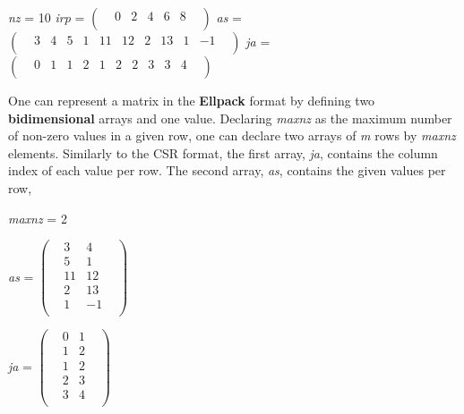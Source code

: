 \documentclass[12pt]{article}
\begin{document}
\begin{center}
\textit{nz}  =  10 
\linebreak
\linebreak
\textit{irp}  =   
$
\begin{pmatrix}
    & 0 & 2 & 4 & 6 & 8 & \\
\end{pmatrix}
$
\linebreak
\linebreak
\textit{as}  =   
$
\begin{pmatrix}
    & 3 & 4 & 5 & 1 & 11 & 12 & 2 & 13 & 1 & -1 & \\
\end{pmatrix}
$
\linebreak
\linebreak
\textit{ja}  =   
$
\begin{pmatrix}
    & 0 & 1 & 1 & 2 & 1 & 2 & 2 & 3 & 3 & 4 & \\
\end{pmatrix}
$
\linebreak
\end{center}

\par One can represent a matrix in the \textbf{Ellpack} format by defining two \textbf{bidimensional} arrays and one value. Declaring \textit{maxnz} as the maximum number of non-zero values in a given row, one can declare two arrays of \textit{m} rows by \textit{maxnz} elements. Similarly to the CSR format, the first array, \textit{ja}, contains the column index of each value per row. The second array, \textit{as}, contains the given values per row,

\begin{center}
\textit{maxnz}  =  2 
\linebreak
\linebreak

\begin{minipage}{.4\textwidth}
  \center
  \textit{as}  =   
$
\begin{pmatrix}
    & 3 & 4 & \\
    & 5 & 1 & \\
    & 11 & 12 & \\
    & 2 & 13 & \\
    & 1 & -1 & \\
\end{pmatrix}
$
\end{minipage}%
\begin{minipage}{.4\textwidth}
 \center
  \textit{ja}  =   
$
\begin{pmatrix}
    & 0 & 1 & \\
    & 1 & 2 & \\
    & 1 & 2 & \\
    & 2 & 3 & \\
    & 3 & 4 & \\
\end{pmatrix}
$
\end{minipage}
\end{center}
\end{document}
